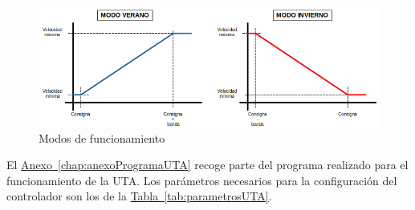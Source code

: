 \begin{figure}[H]
  \centering
  \includegraphics[width=\textwidth, keepaspectratio]{img/curvaModos}
  \caption{Modos de funcionamiento}
  \label{figura:curvasModos}
\end{figure}



El \hyperref[chap:anexoProgramaUTA]{Anexo~\ref{chap:anexoProgramaUTA}} recoge parte del programa realizado para el funcionamiento de la UTA. Los parámetros necesarios para la configuración del controlador son los de la \hyperref[tab:parametrosUTA]{Tabla~\ref{tab:parametrosUTA}}.


